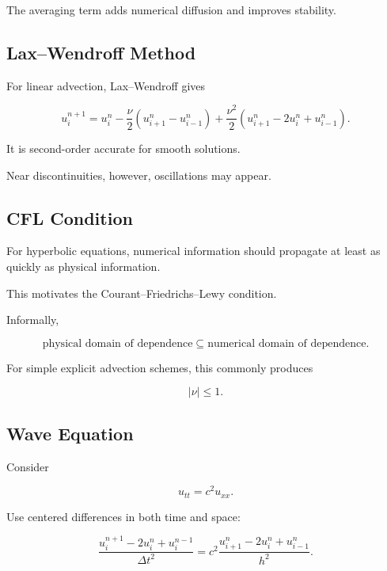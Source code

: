 The averaging term adds numerical diffusion and improves stability.

\subsection{Lax--Wendroff Method}
\label{subsec:lax-wendroff}

For linear advection, Lax--Wendroff gives

\[
\boxed{
u_i^{n+1}
=
u_i^n
-
\frac{\nu}{2}
\left(
u_{i+1}^n-u_{i-1}^n
\right)
+
\frac{\nu^2}{2}
\left(
u_{i+1}^n
-
2u_i^n
+
u_{i-1}^n
\right).
}
\]

It is second-order accurate for smooth solutions.

Near discontinuities, however, oscillations may appear.

\subsection{CFL Condition}
\label{subsec:cfl-condition}

For hyperbolic equations, numerical information should propagate at least
as quickly as physical information.

This motivates the Courant--Friedrichs--Lewy condition.

Informally,

\[
\boxed{
\text{physical domain of dependence}
\subseteq
\text{numerical domain of dependence}.
}
\]

For simple explicit advection schemes, this commonly produces

\[
\boxed{
|\nu|
\leq1.
}
\]

\subsection{Wave Equation}
\label{subsec:numerical-wave-equation}

Consider

\[
\boxed{
u_{tt}
=
c^2u_{xx}.
}
\]

Use centered differences in both time and space:

\[
\frac{
u_i^{n+1}
-
2u_i^n
+
u_i^{n-1}
}{
\Delta t^2
}
=
c^2
\frac{
u_{i+1}^n
-
2u_i^n
+
u_{i-1}^n
}{
h^2
}.
\]

